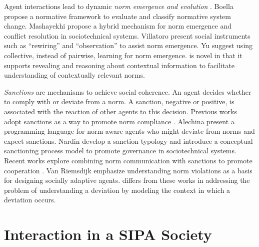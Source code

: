 Agent interactions lead to dynamic \emph{norm emergence and evolution} \citep{Savarimuthu2009NormEmergence}. 
Boella {\etal}  propose a normative framework to evaluate and classify normative system change. Mashayekhi {\etal}  propose a hybrid mechanism for norm emergence and conflict resolution in sociotechnical systems. Villatoro {\etal}  present social instruments
such as ``rewiring'' and ``observation'' to assist norm emergence. Yu {\etal}  suggest using collective, instead of pairwise, learning for norm emergence. 
%
\frameworkB is novel in that it supports revealing and reasoning 
about contextual information to facilitate understanding of contextually relevant norms. 

\emph{Sanctions} are mechanisms to achieve social coherence.
An agent decides whether to comply with or deviate from a norm. A sanction, negative or positive, is associated with 
the reaction of other agents to this decision. Previous works adopt
sanctions as a way to promote norm compliance \citep{Noussair2005SanctionsAndCooperation,Egas2008AltruisticPunishment}. 
Alechina {\etal}  present
a programming language for norm-aware agents who might deviate from norms and
expect sanctions.  
Nardin {\etal} 
develop a sanction typology and introduce a conceptual sanctioning
process model to promote governance in sociotechnical systems. 
Recent works explore combining norm communication with sanctions to 
promote cooperation \citep{Andrighetto-2013-PunishVoice}. 
Van Riemsdijk {\etal}  emphasize 
understanding norm violations as a basis for designing socially adaptive agents. 
\frameworkB differs from these works in addressing the problem of understanding a deviation by modeling the context in which a deviation occurs.

\section{Interaction in a SIPA Society}%
\label{sec:Poros-framework}

